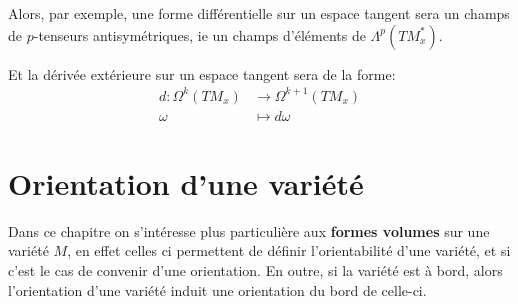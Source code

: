    Alors, par exemple, une forme différentielle sur un espace tangent sera un champs de $p$-tenseurs antisymétriques, ie un champs d'éléments de \( \Lambda^p(TM^*_x) \).\<

   Et la dérivée extérieure sur un espace tangent sera de la forme:
   \[ 
      \begin{aligned}
         d : \Omega^k(TM_x) &\longrightarrow \Omega^{k+1}(TM_x)\\
         \omega &\longmapsto d\omega
      \end{aligned}
   \]

\chapter{Orientation d'une variété}
   Dans ce chapitre on s'intéresse plus particulière aux \textbf{formes volumes} sur une variété \( M \), en effet celles ci permettent de définir l'orientabilité d'une variété, et si c'est le cas de convenir d'une orientation. En outre, si la variété est à bord, alors l'orientation d'une variété induit une orientation du bord de celle-ci.